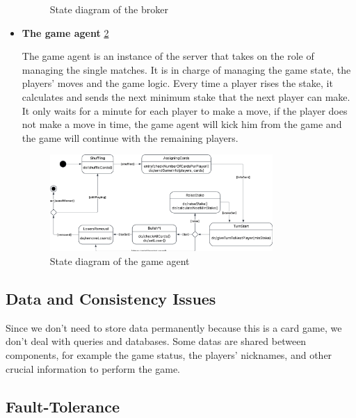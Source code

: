 \documentclass{scrartcl}
\begin{document}
\begin{itemize}
\begin{figure}[H]
              \caption{State diagram of the broker}
              \label{fig:brokerStates}
          \end{figure}
    \item
          \textbf{The game agent} \cref{fig:gameAgentStates} \par
          The game agent is an instance of the server that takes on the role of managing the single matches.
          It is in charge of managing the game state, the players' moves and the game logic. \newline
          Every time a player rises the stake, it calculates and sends the next minimum stake that the 
          next player can make.
          It only waits for a minute for each player to make a move, if the player does not make a move
          in time, the game agent will kick him from the game and the game will continue with the remaining players.
          \begin{figure}[H]
              \centering
              \includegraphics[width=0.8\textwidth]{figures/gameAgentStates.png}
              \caption{State diagram of the game agent}
              \label{fig:gameAgentStates}
          \end{figure}
\end{itemize}

\subsection{Data and Consistency
    Issues}\label{data-and-consistency-issues}

Since we don't need to store data permanently because this is a card game, we don't deal with queries and databases. \newline
Some datas are shared between components, for example the game status, the players' nicknames, and other crucial information to perform the game. \newline

\subsection{Fault-Tolerance}\label{fault-tolerance}
\end{document}
